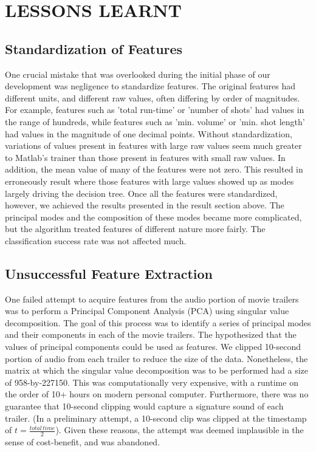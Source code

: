 \documentclass[letterpaper, 10 pt, conference]{ieeeconf}  %
\begin{document}
\section{LESSONS LEARNT}
\subsection{Standardization of Features}
One crucial mistake that was overlooked during the initial phase of our development was negligence to standardize features. The original features had different units, and different raw values, often differing by order of magnitudes. For example, features such as 'total run-time' or 'number of shots' had values in the range of hundreds, while features such as 'min. volume' or 'min. shot length' had values in the magnitude of one decimal points. Without standardization, variations of values present in features with large raw values seem much greater to Matlab's trainer than those present in features with small raw values. In addition, the mean value of many of the features were not zero. This resulted in erroneously result where those features with large values showed up as modes largely driving the decision tree. Once all the features were standardized, however, we achieved the results presented in the result section above. The principal modes and the composition of these modes became more complicated, but the algorithm treated features of different nature more fairly. The classification success rate was not affected much.
\subsection{Unsuccessful Feature Extraction}
One failed attempt to acquire features from the audio portion of movie trailers was to perform a Principal Component Analysis (PCA) using singular value decomposition. The goal of this process was to identify a series of principal modes and their components in each of the movie trailers. The hypothesized that the values of principal components could be used as features. We clipped 10-second portion of audio from each trailer to reduce the size of the data. Nonetheless, the matrix at which the singular value decomposition was to be performed had a size of 958-by-227150. This was computationally very expensive, with a runtime on the order of 10+ hours on modern personal computer. Furthermore, there was no guarantee that 10-second clipping would capture a signature sound of each trailer. (In a preliminary attempt, a 10-second clip was clipped at the timestamp of $t=\frac{total\, time}{2}$). Given these reasons, the attempt was deemed implausible in the sense of cost-benefit, and was abandoned.
\end{document}
